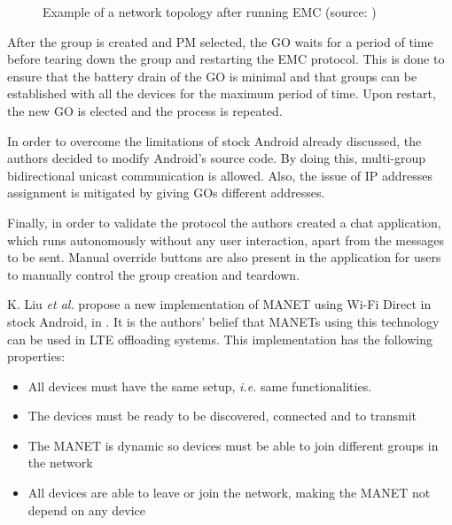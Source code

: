 \begin{figure}[ht]
	\noindent{}
	\caption{\label{fig:emc} Example of a network topology after running EMC (source: \cite{emc})}
\end{figure}

After the group is created and \gls{PM} selected, the \gls{GO} waits for a period of time before tearing down the group and restarting the EMC protocol. This is done to ensure that the battery drain of the \gls{GO} is minimal and that groups can be established with all the devices for the maximum period of time. Upon restart, the new \gls{GO} is elected and the process is repeated.

In order to overcome the limitations of stock Android already discussed, the authors decided to modify Android's source code. By doing this, multi-group bidirectional unicast communication is allowed. Also, the issue of \gls{IP} addresses assignment is mitigated by giving \glspl{GO} different addresses.

Finally, in order to validate the protocol the authors created a chat application, which runs autonomously without any user interaction, apart from the messages to be sent. Manual override buttons are also present in the application for users to manually control the group creation and teardown.\newline

K. Liu \textit{et al.} propose a new implementation of \gls{MANET}
 using Wi-Fi Direct in stock Android, in \cite{manet}. It is the authors' belief that \glspl{MANET} using this technology can be used in \gls{LTE} offloading systems. This implementation has the following properties:

\begin{itemize}
\item All devices must have the same setup, \textit{i.e.} same functionalities.
\item The devices must be ready to be discovered, connected and to transmit
\item The \gls{MANET} is dynamic so devices must be able to join different groups in the network
\item All devices are able to leave or join the network, making the \gls{MANET} not depend on any device
\end{itemize}

